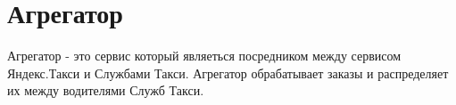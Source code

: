 \chapter{Агрегатор}

	Агрегатор - это сервис который являеться посредником между сервисом Яндекс.Такси и Службами Такси. Агрегатор обрабатывает заказы и распределяет их между водителями Служб Такси.

	
	
